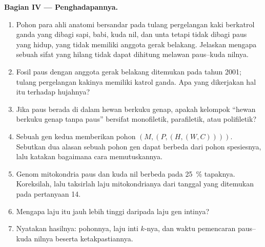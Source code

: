 \begin{problem}
\medskip
\noindent\textbf{Bagian IV --- Penghadapannya.}
\begin{enumerate}[resume]
  \item Pohon para ahli anatomi bersandar pada tulang pergelangan kaki
        berkatrol ganda yang dibagi sapi, babi, kuda nil, dan unta
        tetapi tidak dibagi paus yang hidup, yang tidak memiliki
        anggota gerak belakang. Jelaskan mengapa sebuah sifat yang
        hilang tidak dapat dihitung melawan  paus--kuda nilnya.
  \item Fosil paus dengan anggota gerak belakang ditemukan pada tahun
        2001; tulang pergelangan kakinya memiliki katrol ganda. Apa
        yang dikerjakan hal itu terhadap hujahnya?
  \item Jika paus berada di dalam hewan berkuku genap, apakah kelompok
        ``hewan berkuku genap tanpa paus'' bersifat monofiletik,
        parafiletik, atau polifiletik?
  \item Sebuah gen kedua memberikan pohon $(M,(P,(H,(W,C))))$.
        Sebutkan dua alasan sebuah pohon gen dapat berbeda dari pohon
        spesiesnya, lalu katakan bagaimana cara memutuskannya.
  \item Genom mitokondria paus dan kuda nil berbeda pada \qty{25}{\%}
        tapaknya. Koreksilah, lalu taksirlah laju mitokondrianya dari
        tanggal yang ditemukan pada pertanyaan 14.
  \item Mengapa laju itu jauh lebih tinggi daripada laju gen intinya?
  \item Nyatakan hasilnya: pohonnya, laju inti $k$-nya, dan waktu
        pemencaran paus--kuda nilnya beserta ketakpastiannya.
\end{enumerate}
\end{problem}
